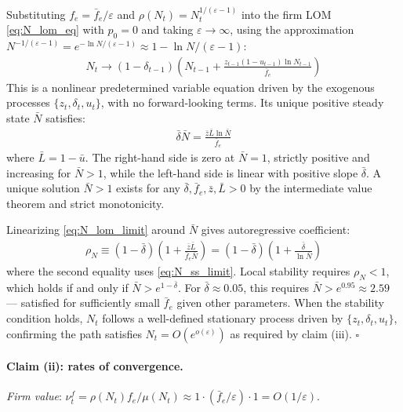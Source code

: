 \documentclass[authoryear, review, 12pt]{elsarticle}
\begin{document}
Substituting $f_e=\bar{f}_e/\varepsilon$ and 
$\rho(N_t)=N_t^{1/(\varepsilon-1)}$ into the firm 
LOM \eqref{eq:N_lom_eq} with $p_0=0$ and taking 
$\varepsilon\to\infty$, using the approximation 
$N^{-1/(\varepsilon-1)} = e^{-\ln N/(\varepsilon-1)} 
\approx 1-\ln N/(\varepsilon-1)$:
\begin{align}\label{eq:N_lom_limit}
	N_t \to (1-\delta_{t-1})
	\left(N_{t-1} + \frac{z_{t-1}(1-u_{t-1})
		\ln N_{t-1}}{\bar{f}_e}\right)
\end{align}
This is a nonlinear predetermined variable equation 
driven by the exogenous processes 
$\{z_t,\delta_t,u_t\}$, with no forward-looking 
terms. Its unique positive steady state 
$\bar{N}$ satisfies:
\begin{align}\label{eq:N_ss_limit}
	\bar{\delta}\bar{N} = 
	\frac{\bar{z}\bar{L}\ln\bar{N}}{\bar{f}_e}
\end{align}
where $\bar{L}=1-\bar{u}$. The right-hand side 
is zero at $\bar{N}=1$, strictly positive and 
increasing for $\bar{N}>1$, while the left-hand 
side is linear with positive slope $\bar{\delta}$. 
A unique solution $\bar{N}>1$ exists for any 
$\bar{\delta},\bar{f}_e,\bar{z},\bar{L}>0$ by 
the intermediate value theorem and strict 
monotonicity.

Linearizing \eqref{eq:N_lom_limit} around 
$\bar{N}$ gives autoregressive coefficient:
\begin{align}
	\rho_N \equiv (1-\bar{\delta})
	\left(1+\frac{\bar{z}\bar{L}}
	{\bar{f}_e\bar{N}}\right)
	= (1-\bar{\delta})
	\left(1+\frac{\bar{\delta}}{\ln\bar{N}}\right)
\end{align}
where the second equality uses 
\eqref{eq:N_ss_limit}. Local stability requires 
$\rho_N < 1$, which holds if and only if 
$\bar{N} > e^{1-\bar{\delta}}$. For 
$\bar{\delta}\approx 0.05$, this requires 
$\bar{N}>e^{0.95}\approx 2.59$ --- satisfied for 
sufficiently small $\bar{f}_e$ given other 
parameters. When the stability condition holds, 
$N_t$ follows a well-defined stationary process 
driven by $\{z_t,\delta_t,u_t\}$, confirming the 
path satisfies $N_t=O(e^{o(\varepsilon)})$ as 
required by claim (iii). $\square$

\paragraph{Claim (ii): rates of convergence.}

\emph{Firm value}: $\nu_t^f=\rho(N_t)f_e/\mu(N_t) 
\approx 1\cdot(\bar{f}_e/\varepsilon)\cdot 1 = 
O(1/\varepsilon)$.
\end{document}

